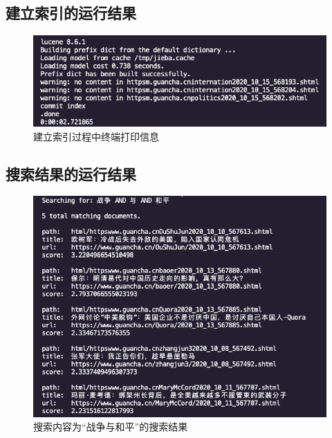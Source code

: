\documentclass[UTF8]{ctexart}
\begin{document}
        \subsection{建立索引的运行结果}
            \begin{figure}[ht]
                \centering
                \includegraphics[scale=0.5]{img/create_index.png}
                \caption{建立索引过程中终端打印信息}
            \end{figure}
        \subsection{搜索结果的运行结果}
            \begin{figure}[ht]
                \centering
                \includegraphics[scale=0.5]{img/search_result.png}
                \caption{搜索内容为“战争与和平”的搜索结果}
            \end{figure}
\end{document}
